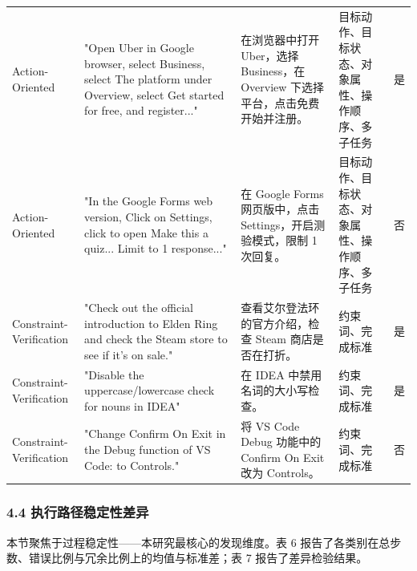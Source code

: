 \documentclass[12pt,a4paper,openany,oneside]{ctexrep}
\begin{document}
\begin{table}[htbp]
{\begin{tabular}{l l l l l}
Action-Oriented & "Open Uber in Google browser, select Business, select The platform under Overview, select Get started for free, and register..." & 在浏览器中打开 Uber，选择 Business，在 Overview 下选择平台，点击免费开始并注册。 & 目标动作、目标状态、对象属性、操作顺序、多子任务 & 是 \\
Action-Oriented & "In the Google Forms web version, Click on Settings, click to open Make this a quiz... Limit to 1 response..." & 在 Google Forms 网页版中，点击 Settings，开启测验模式，限制 1 次回复。 & 目标动作、目标状态、对象属性、操作顺序、多子任务 & 否 \\
Constraint-Verification & "Check out the official introduction to Elden Ring and check the Steam store to see if it's on sale." & 查看艾尔登法环的官方介绍，检查 Steam 商店是否在打折。 & 约束词、完成标准 & 是 \\
Constraint-Verification & "Disable the uppercase/lowercase check for nouns in IDEA" & 在 IDEA 中禁用名词的大小写检查。 & 约束词、完成标准 & 是 \\
Constraint-Verification & "Change Confirm On Exit in the Debug function of VS Code: to Controls." & 将 VS Code Debug 功能中的 Confirm On Exit 改为 Controls。 & 约束词、完成标准 & 否 \\
\bottomrule
\end{tabular}
}
\end{table}

\subsubsection{4.4 执行路径稳定性差异}


本节聚焦于过程稳定性——本研究最核心的发现维度。表 6 报告了各类别在总步数、错误比例与冗余比例上的均值与标准差；表 7 报告了差异检验结果。


\begin{table}[htbp]
\centering
\caption{表 6：各类别过程性结果指标描述统计}
\small
{}
\end{table}
\end{document}
